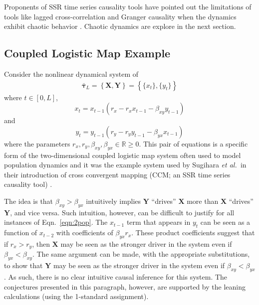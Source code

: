 \documentclass[a4paper,11pt,twocolumn]{article}
\begin{document}
Proponents of SSR time series causality tools have pointed out the limitations of tools like lagged cross-correlation and Granger causality when the dynamics exhibit chaotic behavior \cite{Sugihara2012}.  Chaotic dynamics are explore in the next section.

\subsection{Coupled Logistic Map Example}
\label{sec:2Pop}
Consider the nonlinear dynamical system of
\begin{eqnarray}
\label{eqn:2pop}
\bar{\mathbf{\tau}}_L = \left\{\mathbf{X},\mathbf{Y}\right\} = \left\{\{x_t\},\{y_t\}\right\}
\end{eqnarray}
where $t\in[0,L]$,
\begin{equation*}
x_t = x_{t-1}\left(r_x-r_x x_{t-1}-\beta_{xy} y_{t-1}\right)
\end{equation*}
and
\begin{equation*}
y_t = y_{t-1}\left(r_y-r_y y_{t-1}-\beta_{yx} x_{t-1}\right)
\end{equation*}
where the parameters $r_x,r_y,\beta_{xy},\beta_{yx}\in\mathbb{R}\ge 0$.  This pair of equations is a specific form of the two-dimensional coupled logistic map system often used to model population dynamics \cite{Lloyd1995} and it was the example system used by Sugihara {\em et al.\ }in their introduction of cross convergent mapping (CCM; an SSR time series causality tool) \cite{Sugihara2012}.

The idea is that $\beta_{xy}>\beta_{yx}$ intuitively implies $\mathbf{Y}$ ``drives'' $\mathbf{X}$ more than $\mathbf{X}$ ``drives'' $\mathbf{Y}$, and vice versa.  Such intuition, however, can be difficult to justify for all instances of Eqn.\ \ref{eqn:2pop}.  The $x_{t-1}$ term that appears in $y_t$ can be seen as a function of $x_{t-2}$ with coefficients of $\beta_{yx}r_x$.  These product coefficients suggest that if $r_x>r_y$, then $\mathbf{X}$ may be seen as the stronger driver in the system even if $\beta_{yx}<\beta_{xy}$.  The same argument can be made, with the appropriate substitutions, to show that $\mathbf{Y}$ may be seen as the stronger driver in the system even if $\beta_{xy}<\beta_{yx}$.  As such, there is no clear intuitive causal inference for this system.  The conjectures presented in this paragraph, however, are supported by the leaning calculations (using the 1-standard assignment).
\end{document}
